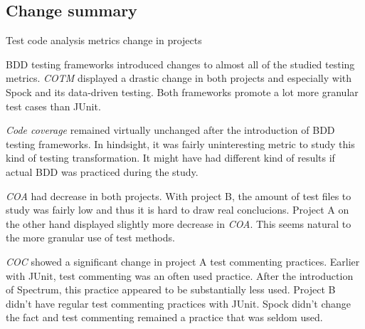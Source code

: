 \subsection{Change summary}

{\renewcommand{\arraystretch}{1.3}
\begin{table}[H]
        \caption {Test code analysis metrics change in projects} \label{tab:test-change}
        \caption*{+ = Increase amount, - = Decrease amount}
\end{table}
}

BDD testing frameworks introduced changes to almost all of the studied testing metrics. \textit{COTM} displayed a drastic change
in both projects and especially with Spock and its data-driven testing. Both frameworks promote a lot more granular
test cases than JUnit.

\textit{Code coverage} remained virtually unchanged after the introduction of BDD testing frameworks. In
hindsight, it was fairly uninteresting metric to study this kind of testing transformation. It might have had different
kind of results if actual BDD was practiced during the study.

\textit{COA} had decrease in both projects. With project B, the amount of test files to study was fairly low and thus it is
hard to draw real conclucions. Project A on the other hand displayed slightly more decrease in \textit{COA}. This seems natural
to the more granular use of test methods.

\textit{COC} showed a significant change in project A test commenting practices. Earlier with JUnit, test commenting was an often
used practice. After the introduction of Spectrum, this practice appeared to be substantially less used. Project B didn't
have regular test commenting practices with JUnit. Spock didn't change the fact and test commenting remained a practice
that was seldom used.

